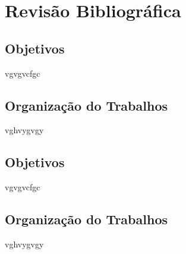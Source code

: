 \chapter{Revisão Bibliográfica}



\section{Objetivos}

vgvgvcfgc

\section{Organização do Trabalhos}

 vghvygvgy



\section{Objetivos}

vgvgvcfgc

\section{Organização do Trabalhos}

 vghvygvgy